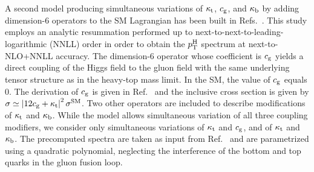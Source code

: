 A second model producing simultaneous variations of $\kappa_{\mathrm{t}}$, $c_\mathrm{g}$, and $\kappa_{\mathrm{b}}$ by adding dimension-6 operators to the SM Lagrangian has been built in Refs.~\cite{Grazzini:2017szg,Grazzini:2016paz}.
% 
This study employs an analytic resummation performed up to next-to-next-to-leading-logarithmic (NNLL) order in order to obtain the $p_\mathrm{T}^\mathrm{H}$ spectrum at next-to-NLO+NNLL accuracy.
% 
The dimension-6 operator whose coefficient is $c_\mathrm{g}$ yields a direct coupling of the Higgs field to the gluon field with the same underlying tensor structure as in the heavy-top mass limit.
% 
In the SM, the value of $c_\mathrm{g}$ equals 0.
% 
The derivation of $c_\mathrm{g}$ is given in Ref.~\cite{Grazzini:2017szg} and the inclusive cross section is given by $\sigma \simeq \left| 12c_\mathrm{g} + \kappa_{\mathrm{t}} \right|^2 \sigma^\text{SM}$.
% 
Two other operators are included to describe modifications of $\kappa_{\mathrm{t}}$ and $\kappa_{\mathrm{b}}$.
% 
While the model allows simultaneous variation of all three coupling modifiers, we consider only simultaneous variations of $\kappa_{\mathrm{t}}$ and $c_\mathrm{g}$, and of $\kappa_{\mathrm{t}}$ and $\kappa_{\mathrm{b}}$.
% 
The precomputed spectra are taken as input from Ref.~\cite{Grazzini:2017szg} and are parametrized using a quadratic polynomial, neglecting the interference of the bottom and top quarks in the gluon fusion loop.







